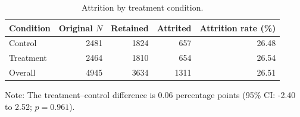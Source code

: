 \begin{table}
\caption{\label{tab:attrition-summary}Attrition by treatment condition.}
\centering
\begin{threeparttable}
\begin{tabular}[t]{lrrrr}
\toprule
Condition & Original $N$ & Retained & Attrited & Attrition rate (\%)\\
\midrule
Control & 2481 & 1824 & 657 & 26.48 \\
Treatment & 2464 & 1810 & 654 & 26.54 \\
Overall & 4945 & 3634 & 1311 & 26.51 \\
\bottomrule
\end{tabular}
\begin{tablenotes}
\item Note: The treatment--control difference is 0.06 percentage points (95\% CI: -2.40 to 2.52; $p=0.961$).
\end{tablenotes}
\end{threeparttable}
\end{table}

